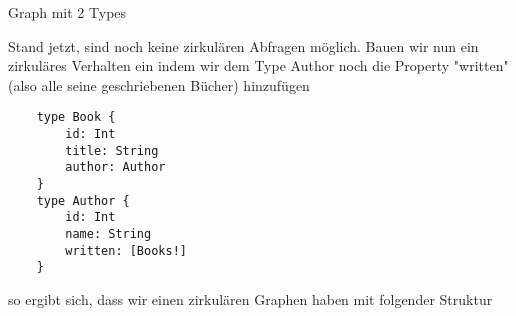 \begin{figure2}
    \begin{center}
        \caption{Graph mit 2 Types}
    \end{center}
    \label{fig:2types}
\end{figure2}

Stand jetzt, sind noch keine zirkulären Abfragen möglich. Bauen wir nun ein zirkuläres Verhalten ein indem wir dem Type
Author noch die Property "written" (also alle seine geschriebenen Bücher) hinzufügen

\begin{verbatim}
    type Book {
        id: Int
        title: String
        author: Author
    }
    type Author {
        id: Int
        name: String
        written: [Books!]
    }
\end{verbatim}

so ergibt sich, dass wir einen zirkulären Graphen haben mit folgender Struktur

